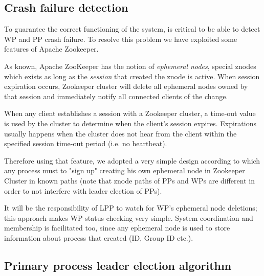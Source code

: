 \documentclass[sigchi]{acmart}
\begin{document}
\subsection{Crash failure detection} To guarantee the correct functioning of the system, is critical to be able to detect WP and PP crash failure. To resolve this problem we have exploited some features of Apache Zookeeper. 

As known, Apache ZooKeeper has the notion of \textit{ephemeral nodes}, special znodes which exists as long as the \textit{session} that created the znode is active. When session expiration occurs, Zookeeper cluster will delete all ephemeral nodes owned by that session and immediately notify all connected clients of the change.

When any client establishes a session with a Zookeeper cluster, a time-out value is used by the cluster to determine when the client's session expires. Expirations usually happens when the cluster does not hear from the client within the specified session time-out period (i.e. no heartbeat).

Therefore using that feature, we adopted a very simple design according to which any process must to "sign up" creating his own ephemeral node in Zookeeper Cluster in known paths (note that znode paths of PPs and WPs are different in order to not interfere with leader election of PPs). 

It will be the responsibility of LPP to watch for WP's ephemeral node deletions; this approach makes WP status checking very simple. System coordination and membership is facilitated too, since any ephemeral node is used to store information about process that created (ID, Group ID etc.).


\subsection{Primary process leader election algorithm}
\end{document}

